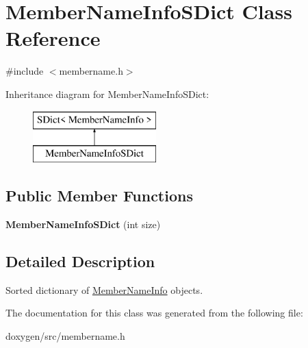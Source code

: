 \hypertarget{class_member_name_info_s_dict}{}\section{Member\+Name\+Info\+S\+Dict Class Reference}
\label{class_member_name_info_s_dict}


{\ttfamily \#include $<$membername.\+h$>$}

Inheritance diagram for Member\+Name\+Info\+S\+Dict\+:\begin{figure}[H]
\begin{center}
\leavevmode
\includegraphics[height=2.000000cm]{class_member_name_info_s_dict}
\end{center}
\end{figure}
\subsection*{Public Member Functions}
\begin{DoxyCompactItemize}
\item 
\mbox{\label{class_member_name_info_s_dict_a04f5ce83ebb17c4785b8e90ce05c5f57}} 
{\bfseries Member\+Name\+Info\+S\+Dict} (int size)
\end{DoxyCompactItemize}


\subsection{Detailed Description}
Sorted dictionary of \mbox{\hyperlink{class_member_name_info}{Member\+Name\+Info}} objects. 

The documentation for this class was generated from the following file\+:\begin{DoxyCompactItemize}
\item 
doxygen/src/membername.\+h\end{DoxyCompactItemize}

